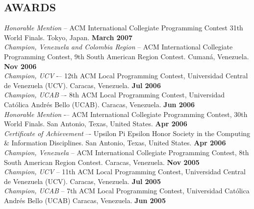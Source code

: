 \documentclass[line,margin]{res}
\begin{document}
\begin{resume}
\section{AWARDS}
  {\sl Honorable Mention} -- ACM International Collegiate Programming Contest 31th World Finals. 
  Tokyo, Japan. \textbf{March 2007} \\
  \newline
  {\sl Champion, Venezuela and Colombia Region} -- ACM International Collegiate Programming Contest, 9th South 
  American Region Contest. Cumaná, Venezuela. \textbf{Nov 2006} \\
  \newline
  {\sl Champion, UCV} -– 12th ACM Local Programming Contest, Universidad Central de Venezuela (UCV). 
  Caracas, Venezuela. \textbf{Jul 2006} \\
  \newline
  {\sl Champion, UCAB} –- 8th ACM Local Programming Contest, Universidad Católica Andrés Bello (UCAB). 
  Caracas, Venezuela. \textbf{Jun 2006} \\
  \newline
  {\sl Honorable Mention} -– ACM International Collegiate Programming Contest, 30th World Finals. 
  San Antonio, Texas, United States. \textbf {Apr 2006} \\
  \newline
  {\sl Certificate of Achievement} –- Upsilon Pi Epsilon Honor Society in the Computing \& Information Disciplines. 
  San Antonio, Texas, United States. \textbf {Apr 2006} \\
  \newline
  {\sl Champion, Venezuela} – ACM International Collegiate Programming Contest, 8th South American Region 
  Contest. Caracas, Venezuela. \textbf {Nov 2005} \\
  \newline
  {\sl Champion, UCV} – 11th ACM Local Programming Contest, Universidad Central de Venezuela (UCV). 
  Caracas, Venezuela. \textbf {Jul 2005} \\
  \newline
  {\sl Champion, UCAB} – 7th ACM Local Programming Contest, Universidad Católica Andrés Bello (UCAB)
  Caracas, Venezuela. \textbf {Jun 2005} \\


\end{resume}
\end{document}
